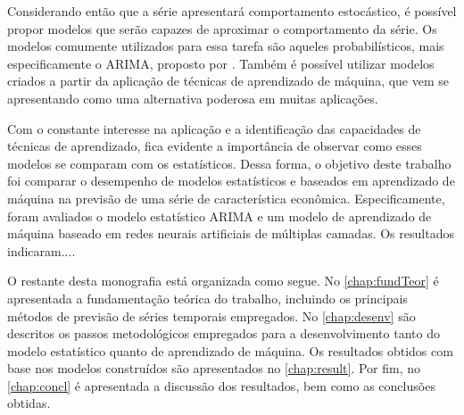 \documentclass[
    12pt,
    oneside,
    a4paper,
    english,
    brazil
]{abntex2}
\begin{document}
Considerando então que a série apresentará comportamento estocástico, é possível propor modelos que serão capazes de aproximar o comportamento da série. Os modelos comumente utilizados para essa tarefa são aqueles probabilísticos, mais especificamente o ARIMA\@, proposto por . Também é possível utilizar modelos criados a partir da aplicação de técnicas de aprendizado de máquina, que vem se apresentando como uma alternativa poderosa em
muitas aplicações.

Com o constante interesse na aplicação e a identificação das capacidades de
técnicas de aprendizado, fica evidente a importância de observar como esses modelos se comparam com os estatísticos. Dessa forma, o objetivo deste trabalho foi comparar o desempenho de modelos estatísticos e baseados em aprendizado de máquina na previsão de uma série de característica econômica. Especificamente, foram avaliados o modelo estatístico ARIMA e um modelo de aprendizado de máquina baseado em redes neurais artificiais de múltiplas camadas. Os resultados indicaram....




O restante desta monografia está organizada como segue. No \autoref{chap:fundTeor} é apresentada a fundamentação teórica do trabalho, incluindo os principais métodos de previsão de séries temporais empregados. No \autoref{chap:desenv} são descritos os passos metodológicos empregados para a desenvolvimento tanto do modelo estatístico quanto de aprendizado de máquina. Os resultados obtidos com base nos modelos construídos são apresentados no
\autoref{chap:result}. 
Por fim, no \autoref{chap:concl} é apresentada a discussão dos resultados, bem como as conclusões obtidas.
\end{document}
